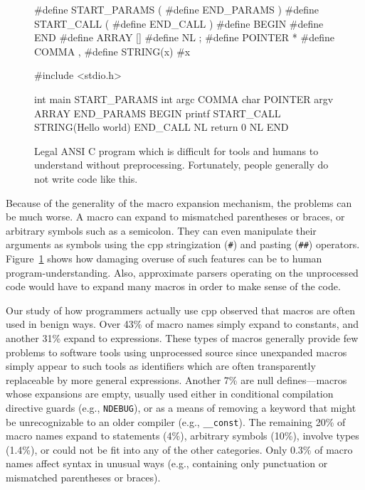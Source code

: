 \documentclass{article}
\newcommand{\Cpp}{\mbox{\textsf{cpp}}}
\newcommand{\C}{\mbox{\textsf{C}}}
\newcommand{\eg}{e.g.,}
\begin{document}
\begin{figure}[hbtp]
\begin{center}
\begin{small}
\begin{pseudocode}[5.5in]
#define START_PARAMS (
#define END_PARAMS )
#define START_CALL (
#define END_CALL )
#define BEGIN {
#define END }
#define ARRAY []
#define NL ;
#define POINTER *
#define COMMA ,
#define STRING(x) #x

#include <stdio.h>

int main START_PARAMS int argc COMMA char POINTER argv ARRAY END_PARAMS BEGIN
  printf START_CALL STRING(Hello world\n) END_CALL NL
  return 0 NL
END
\end{pseudocode}
\end{small}
\caption{Legal ANSI \C{} program which is difficult for tools and humans
  to understand without preprocessing.  Fortunately, people generally do
  not write code like this.}
\label{fig:worstcase}
\end{center}
\end{figure}

Because of the generality of the macro expansion mechanism, the problems
can be much worse.  A macro can expand to mismatched parentheses or
braces, or arbitrary symbols such as a semicolon.  They can even
manipulate their arguments as symbols using the \Cpp{} stringization
(\texttt{\#}) and pasting (\texttt{\#\#}) operators.
Figure~\ref{fig:worstcase} shows how damaging overuse of such features
can be to human program-understanding.  Also, approximate parsers operating on
the unprocessed code would have to expand many macros in order to make
sense of the code.

Our study of how programmers actually use
\Cpp{} observed that macros are often used in benign ways.  Over 43\% of macro
names simply expand to constants, and another 31\% expand to
expressions.  These types of macros generally provide few problems to
software tools using unprocessed source since unexpanded macros simply
appear to such tools as identifiers which are often transparently
replaceable by more general expressions.  Another 7\% are null
defines---macros whose expansions are empty, usually used either in
conditional compilation directive guards (\eg{} \texttt{NDEBUG}), or as a means
of removing a keyword that might be unrecognizable to an older compiler
(\eg{} \texttt{\_\_const}).  The remaining 20\% of macro names expand to statements
(4\%), arbitrary symbols (10\%), involve types (1.4\%), or could not be
fit into any of the other categories.  Only 0.3\% of macro names affect syntax in
unusual ways (\eg{} containing only punctuation or mismatched
parentheses or braces).
\end{document}
